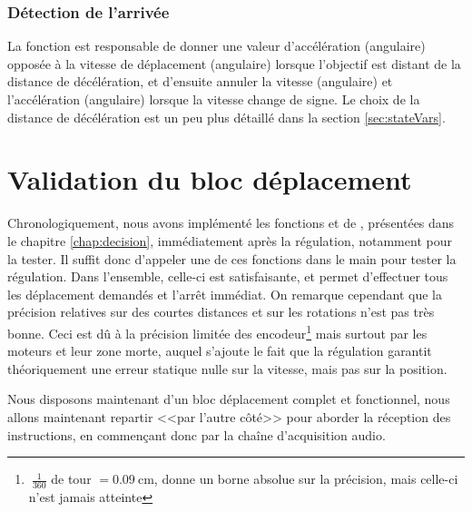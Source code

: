 \subsubsection{Détection de l'arrivée}
La fonction  est responsable de donner une valeur d'accélération (angulaire) opposée à la vitesse de déplacement (angulaire) lorsque l'objectif est distant de la distance de décélération, et d'ensuite annuler la vitesse (angulaire) et l'accélération (angulaire) lorsque la vitesse change de signe. Le choix de la distance de décélération est un peu plus détaillé dans la section \ref{sec:stateVars}.

\section{Validation du bloc déplacement}
Chronologiquement, nous avons implémenté les fonctions  et  de , présentées dans le chapitre \ref{chap:decision}, immédiatement après la régulation, notamment pour la tester. Il suffit donc d'appeler une de ces fonctions dans le main pour tester la régulation. Dans l'ensemble, celle-ci est satisfaisante, et permet d'effectuer tous les déplacement demandés et l'arrêt immédiat. On remarque cependant que la précision relatives sur des courtes distances et sur les rotations n'est pas très bonne. Ceci est dû à la précision limitée des encodeur\footnote{$~\frac{1}{360}$ de tour $ = \SI{0.09}{\centi\meter}$, donne un borne absolue sur la précision, mais celle-ci n'est jamais atteinte} mais surtout par les moteurs et leur zone morte, auquel s'ajoute le fait que la régulation garantit théoriquement une erreur statique nulle sur la vitesse, mais pas sur la position.

Nous disposons maintenant d'un bloc déplacement complet et fonctionnel, nous allons maintenant repartir <<par l'autre côté>> pour aborder la réception des instructions, en commençant donc par la chaîne d'acquisition audio.